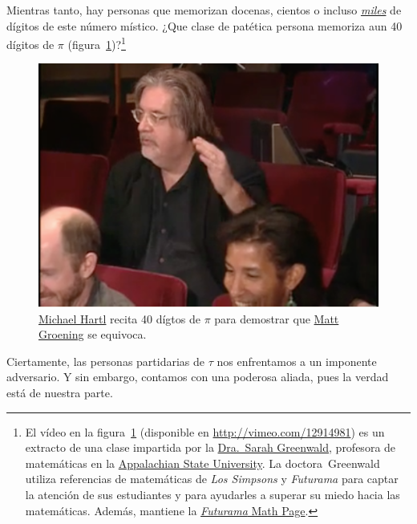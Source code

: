 Mientras tanto, hay personas que memorizan docenas, cientos o incluso  \href{https://en.wikipedia.org/wiki/Lu_Chao}{\emph{miles}} de dígitos de este número místico. ¿Que clase de patética persona memoriza aun 40 dígitos de $\pi$ (figura~\ref{fig:futurama_video})?\footnote{El vídeo en la figura~\ref{fig:futurama_video} (disponible en  \href{http://vimeo.com/12914981}{http://vimeo.com/12914981}) es un extracto de una clase impartida por la \href{http://mathsci.appstate.edu/~sjg/}{Dra.\ Sarah Greenwald}, profesora de matemáticas en la \href{http://www.appstate.edu/}{Appalachian State University}. La doctora\ Greenwald utiliza referencias de matemáticas de \emph{Los Simpsons} y \emph{Futurama} para captar la atención de sus estudiantes y para ayudarles a superar su miedo hacia las matemáticas. Además, mantiene la \href{http://mathsci2.appstate.edu/~sjg/futurama/}{\emph{Futurama} Math Page}.}

\begin{figure}
\begin{center}
\includegraphics{images/figures/futurama_math_lecture.png} %
\end{center}
\caption{\href{https://tauday.com/tau-manifesto/\#sec-about_the_author}{Michael Hartl} recita 40 dígtos de $\pi$ para demostrar que \href{https://es.wikipedia.org/wiki/Matt_Groening}{Matt Groening} se equivoca.\label{fig:futurama_video}}
\end{figure}

Ciertamente, las personas partidarias de $\tau$ nos enfrentamos a un imponente adversario. Y sin embargo, contamos con una poderosa aliada, pues la verdad está de nuestra parte.

